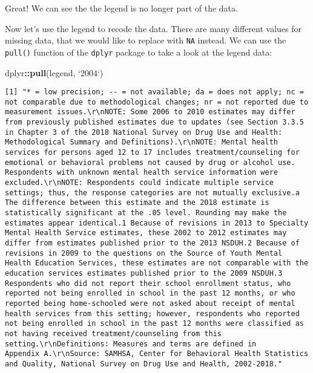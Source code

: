 \documentclass[
]{article}
\newenvironment{Shaded}{\begin{snugshade}}{\end{snugshade}}
\newcommand{\DataTypeTok}[1]{\textcolor[rgb]{0.13,0.29,0.53}{#1}}
\newcommand{\KeywordTok}[1]{\textcolor[rgb]{0.13,0.29,0.53}{\textbf{#1}}}
\newcommand{\NormalTok}[1]{#1}
\newcommand{\OperatorTok}[1]{\textcolor[rgb]{0.81,0.36,0.00}{\textbf{#1}}}
\newcommand{\StringTok}[1]{\textcolor[rgb]{0.31,0.60,0.02}{#1}}
\begin{document}
Great! We can see the the legend is no longer part of the data.

Now let's use the legend to recode the data. There are many different
values for missing data, that we would like to replace with \texttt{NA}
instead. We can use the \texttt{pull()} function of the \texttt{dplyr}
package to take a look at the legend data:

\begin{Shaded}
\begin{Highlighting}[]
\NormalTok{dplyr}\OperatorTok{::}\KeywordTok{pull}\NormalTok{(legend, }\StringTok{`}\DataTypeTok{2004}\StringTok{`}\NormalTok{)}
\end{Highlighting}
\end{Shaded}

\begin{verbatim}
[1] "* = low precision; -- = not available; da = does not apply; nc = not comparable due to methodological changes; nr = not reported due to measurement issues.\r\nNOTE: Some 2006 to 2010 estimates may differ from previously published estimates due to updates (see Section 3.3.5 in Chapter 3 of the 2018 National Survey on Drug Use and Health: Methodological Summary and Definitions).\r\nNOTE: Mental health services for persons aged 12 to 17 includes treatment/counseling for emotional or behavioral problems not caused by drug or alcohol use. Respondents with unknown mental health service information were excluded.\r\nNOTE: Respondents could indicate multiple service settings; thus, the response categories are not mutually exclusive.a The difference between this estimate and the 2018 estimate is statistically significant at the .05 level. Rounding may make the estimates appear identical.1 Because of revisions in 2013 to Specialty Mental Health Service estimates, these 2002 to 2012 estimates may differ from estimates published prior to the 2013 NSDUH.2 Because of revisions in 2009 to the questions on the Source of Youth Mental Health Education Services, these estimates are not comparable with the education services estimates published prior to the 2009 NSDUH.3 Respondents who did not report their school enrollment status, who reported not being enrolled in school in the past 12 months, or who reported being home-schooled were not asked about receipt of mental health services from this setting; however, respondents who reported not being enrolled in school in the past 12 months were classified as not having received treatment/counseling from this setting.\r\nDefinitions: Measures and terms are defined in Appendix A.\r\nSource: SAMHSA, Center for Behavioral Health Statistics and Quality, National Survey on Drug Use and Health, 2002-2018."
\end{verbatim}
\end{document}
